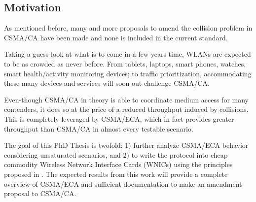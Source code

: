 \subsection{Motivation}
As mentioned before, many and more proposals to amend the collision problem in CSMA/CA have been made and none is included in the current standard.

Taking a guess-look at what is to come in a few years time, WLANs are expected to be as crowded as never before. From tablets, laptops, smart phones, watches, smart health/activity monitoring devices; to traffic prioritization, accommodating these many devices and services will soon out-challenge CSMA/CA.

Even-though CSMA/CA in theory is able to coordinate medium access for many contenders, it does so at the price of a reduced throughput induced by collisions. This is completely leveraged by CSMA/ECA, which in fact provides greater throughput than CSMA/CA in almost every testable scenario.

The goal of this PhD Thesis is twofold: $1$) further analyze CSMA/ECA behavior considering unsaturated scenarios, and $2$) to write the protocol into cheap commodity Wireless Network Interface Cards (WNICs) using the principles proposed in \cite{WMP}. The expected results from this work will provide a complete overview of CSMA/ECA and sufficient documentation to make an amendment proposal to CSMA/CA.